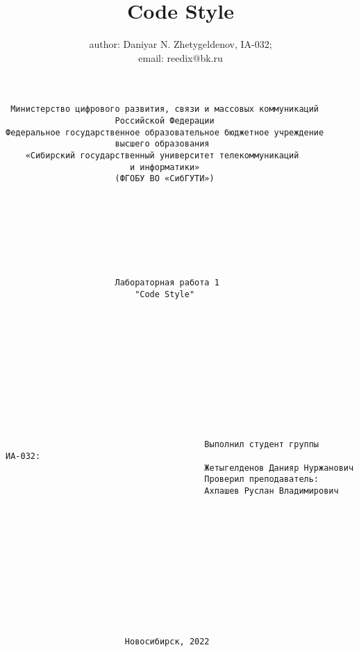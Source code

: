 \documentclass{article}
\title{Code Style}
\author{author: Daniyar N. Zhetygeldenov, IA-032;\\ email: reedix@bk.ru}
\begin{document}
\begin{verbatim}
 Министерство цифрового развития, связи и массовых коммуникаций 
                      Российской Федерации 
Федеральное государственное образовательное бюджетное учреждение 
                      высшего образования 
    «Сибирский государственный университет телекоммуникаций 
                         и информатики»
                      (ФГОБУ ВО «СибГУТИ»)
                         
                         
                         
                         
                         
                         
                         
                         
                      Лабораторная работа 1
                          "Code Style"
                        
                        
                        
                        
                        
                        
                        
                        
                        
                                      
                                      
                                      
                                        Выполнил студент группы ИА-032:
                                        Жетыгелденов Данияр Нуржанович
                                        Проверил преподаватель:
                                        Ахпашев Руслан Владимирович
                                        
                                        
                    
                    
                    
                    
                    
                    
                    
                    
                    
                                        
                        Новосибирск, 2022
\end{verbatim}
\newpage
\tableofcontents
\newpage
\maketitle
\end{document}

